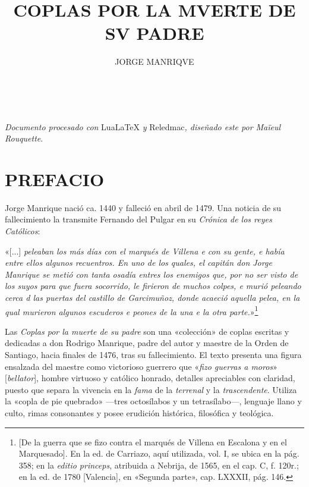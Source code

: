 \documentclass[11pt,a4paper,twoside]{article}
\title{COPLAS POR LA MVERTE DE SV PADRE}
\author{JORGE MANRIQVE}
\date{\fontsize{9}{11}\selectfont{EDICIÓN CRÍTICA}\\\fontsize{40}{11}\selectfont{\vfill\LaTeX}}
\newcommand{\comillas}[1]{«#1»}
\begin{document}
	{
	\maketitle
}
	\newpage

\null
\vfill
\begin{flushright}
	\textit{Documento procesado con} LuaLaTeX \textit{y} Reledmac\textit{, diseñado este por Maïeul Rouquette}.
\end{flushright}
\newpage

\tableofcontents
\newpage

\setcounter{page}{1}
\section*{{\fontsize{14}{14.35}\selectfont PREFACIO}}

Jorge Manrique nació ca. 1440 y falleció en abril de 1479. Una noticia de su fallecimiento la transmite Fernando del Pulgar en su \textit{Crónica de los reyes Católicos}:

\comillas{[...] \textit{peleaban los más días con el marqués de Villena e con su gente, e había entre ellos algunos recuentros. En uno de los quales, el capitán don Jorge Manrique se metió con tanta osadía entres los enemigos que, por no ser visto de los suyos para que fuera socorrido, le firieron de muchos colpes, e murió peleando cerca d las puertas del castillo de Garcimuñoz, donde acaeció aquella pelea, en la qual murieron algunos escuderos e peones de la una e la otra parte.}}\footnote{[De la guerra que se fizo contra el marqués de Villena en Escalona y en el Marquesado]. En la ed. de Carriazo, aquí utilizada, vol. I, se ubica en la pág. 358; en la \textit{editio princeps}, atribuida a Nebrija, de 1565, en el cap. C, f. 120r.; en la ed. de 1780 [Valencia], en \comillas{Segunda parte}, cap. LXXXII, pág. 146.} \vspace{5pt}

Las \textit{Coplas por la muerte de su padre} son una «colección» de coplas escritas y dedicadas a don Rodrigo Manrique, padre del autor y maestre de la Orden de Santiago, hacia finales de 1476, tras su fallecimiento. El texto presenta una figura ensalzada del maestre como victorioso guerrero que \comillas{\textit{fizo guerras a moros}} [\textit{bellator}], hombre virtuoso y católico honrado, detalles apreciables con claridad, puesto que separa la vivencia en la \textit{fama} de la \textit{terrenal} y la \textit{trascendente}. Utiliza la \comillas{copla de pie quebrado} —tres octosílabos y un tetrasílabo—, lenguaje llano y culto, rimas consonantes y posee erudición histórica, filosófica y teológica.
\end{document}
